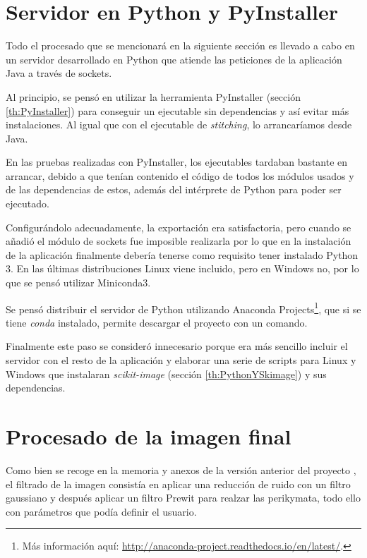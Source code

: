 \section{Servidor en Python y PyInstaller}
Todo el procesado que se mencionará en la siguiente sección es llevado a cabo en un servidor desarrollado en Python que atiende las peticiones de la aplicación Java a través de sockets.

Al principio, se pensó en utilizar la herramienta PyInstaller (sección \ref{th:PyInstaller}) para conseguir un ejecutable sin dependencias y así evitar más instalaciones. Al igual que con el ejecutable de \textit{stitching}, lo arrancaríamos desde Java.

En las pruebas realizadas con PyInstaller, los ejecutables tardaban bastante en arrancar, debido a que tenían contenido el código de todos los módulos usados y de las dependencias de estos, además del intérprete de Python para poder ser ejecutado.

Configurándolo adecuadamente, la exportación era satisfactoria, pero cuando se añadió el módulo de sockets fue imposible realizarla por lo que en la instalación de la aplicación finalmente debería tenerse como requisito tener instalado Python 3. En las últimas distribuciones Linux viene incluido, pero en Windows no, por lo que se pensó utilizar Miniconda3.

Se pensó distribuir el servidor de Python utilizando Anaconda Projects\footnote{Más información aquí: \url{http://anaconda-project.readthedocs.io/en/latest/}.}, que si se tiene \textit{conda} instalado, permite descargar el proyecto con un comando. 

Finalmente este paso se consideró innecesario porque era más sencillo incluir el servidor con el resto de la aplicación y elaborar una serie de scripts para Linux y Windows que instalaran \textit{scikit-image} (sección \ref{th:PythonYSkimage}) y sus dependencias.

\newpage

\section{Procesado de la imagen final}
\label{ar:procesadoFinal}
Como bien se recoge en la memoria y anexos de la versión anterior del proyecto \cite{perikymataV1}, el filtrado de la imagen consistía en aplicar una reducción de ruido con un filtro gaussiano \cite{wiki:gaussianNoise} y después aplicar un filtro Prewit \cite{wiki:Prewitt} para realzar las perikymata, todo ello con parámetros que podía definir el usuario.

